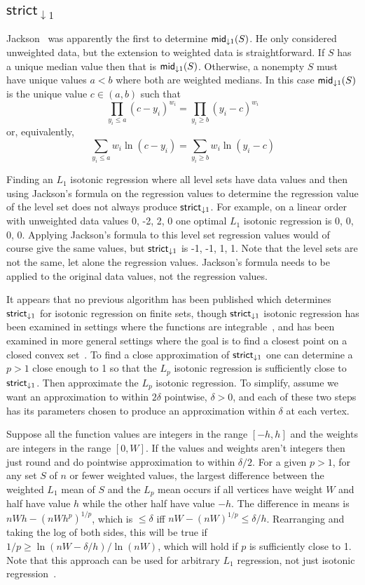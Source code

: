 \documentclass[11pt]{article}
\newcommand{\wmeandown}[2]{\ensuremath{\mathsf{mid}_{\downarrow #1}\ifthenelse{\equal{#2}{}}{}{(#2)}}}
\newcommand{\Strictdown}[2]{\ensuremath{\mathsf{strict}_{\downarrow{#1}}\ifthenelse{\equal{#2}{}}{}{(#2)}}}
\begin{document}
\subsection{$\mathsf{strict}_{\downarrow 1}$}   \label{sec:strictdown1}


Jackson~\cite{Jackson_Median} was apparently the first to determine \wmeandown{1}{S}.
He only considered unweighted data, but the extension to weighted data is straightforward.
If $S$ has a unique median value then that is  \wmeandown{1}{S}.
Otherwise, a nonempty $S$ must have unique values $a < b$ where both are weighted medians.
In this case \wmeandown{1}{S} is the unique value $c \in (a,b)$ such that 
$$\prod_{y_i \leq a} (c-y_i)^{w_i} = \prod_{y_i \geq b} (y_i - c)^{w_i}$$
or, equivalently,
$$\sum_{y_i \leq a}w_i \ln (c-y_i) = \sum_{y_i \geq b} w_i \ln(y_i-c)$$


Finding an $L_1$ isotonic regression where all level sets have data values and then using Jackson's formula on the regression values to determine the regression value of the level set does not always produce \Strictdown{1}{}.
For example, on a linear order with unweighted data values 0, -2, 2, 0 one optimal $L_1$ isotonic regression is 0, 0, 0, 0.
Applying Jackson's formula to this level set regression values would of course give the same values, 
but \Strictdown{1}{} is -1, -1, 1, 1.
Note that the level sets are not the same, let alone the regression values.
Jackson's formula needs to be applied to the original data values, not the regression values.

It appears that no previous algorithm has been published which determines \Strictdown{1}{} for isotonic regression on finite sets, though \Strictdown{1}{} isotonic regression has been examined in settings where the functions are integrable~\cite{HLMT_L1Polya88}, and has been examined in more general settings where the goal is to find a closest point on a closed convex set~\cite{LandersRogge_L1approx}.
To find a close approximation of \Strictdown{1}{} one can determine a $p > 1$ close enough to 1 so that the $L_p$ isotonic regression is sufficiently close to \Strictdown{1}{}.
Then approximate the $L_p$ isotonic regression.
To simplify, assume we want an approximation to within $2\delta$ pointwise, $\delta > 0$, and each of these two steps has its parameters chosen to produce an approximation within $\delta$ at each vertex.

Suppose all the function values are integers in the range $[-h,h]$ and the weights are integers in the range $[0,W]$.
If the values and weights aren't integers then just round and do pointwise approximation to within $\delta/2$.
For a given $p>1$, for any set $S$ of $n$ or fewer weighted values, the largest difference between the weighted $L_1$ mean  of $S$ and the $L_p$ mean occurs if all vertices have weight $W$ and half have value $h$ while the other half have value $-h$.
The difference in means is $nWh - (nWh^p)^{1/p}$, which is $\leq \delta$ iff $nW-(nW)^{1/p} \leq \delta/h$.
Rearranging and taking the log of both sides, this will be true if $1/p \geq \ln(nW-\delta/h)/\ln(nW)$, which will hold if $p$ is sufficiently close to 1.
Note that this approach can be used for arbitrary $L_1$ regression, not just isotonic regression~\cite{LandersRogge_L1approx}.
\end{document}
